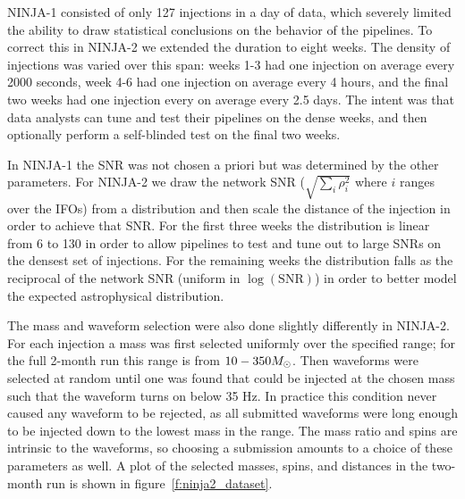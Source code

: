 NINJA-1 consisted of only 127 injections in a day of data, which
severely limited the ability to draw statistical conclusions on the
behavior of the pipelines.  To correct this in NINJA-2 we extended the
duration to eight weeks.  The density of injections was varied over
this span:  weeks 1-3 had one injection on average every 2000 seconds,
week 4-6 had one injection on average every 4 hours, and the final two
weeks had one injection every on average every 2.5 days.  The intent
was that data analysts can tune and test their pipelines on the dense
weeks, and then optionally perform a self-blinded test on the final two
weeks.

In NINJA-1 the SNR was not chosen a priori but was determined by the
other parameters.  For NINJA-2 we draw the network SNR ($\sqrt{\sum_i
\rho_i^2}$ where $i$ ranges over the IFOs) from a distribution and
then scale the distance of the injection in order to achieve that SNR.
For the first three weeks the distribution is linear from 6 to 130 in
order to allow pipelines to test and tune out to large SNRs on the
densest set of injections.  For the remaining weeks the distribution
falls as the reciprocal of the network SNR (uniform in
$\log(\mathrm{SNR})$) in order to better model the expected
astrophysical distribution.

The mass and waveform selection were also done slightly differently in
NINJA-2.  For each injection a mass was first selected uniformly over
the specified range; for the full 2-month run this range is from
$10-350 M_\odot$.  Then waveforms were selected at random until one was
found that could be injected at the chosen mass such that the waveform
turns on below 35 Hz.  In practice this condition never caused any
waveform to be rejected, as all submitted waveforms were long enough
to be injected down to the lowest mass in the range.  The mass ratio
and spins are intrinsic to the waveforms, so choosing a submission
amounts to a choice of these parameters as well.  A plot of the
selected masses, spins, and distances in the two-month run is shown in
figure~\ref{f:ninja2_dataset}.


